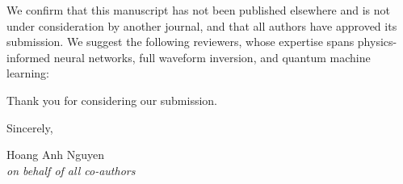 \documentclass[11pt]{article}
\begin{document}
We confirm that this manuscript has not been published elsewhere and is not under consideration by another journal, and that all authors have approved its submission. We suggest the following reviewers, whose expertise spans physics-informed neural networks, full waveform inversion, and quantum machine learning:

Thank you for considering our submission.

\vspace{0.8em}
\noindent Sincerely,

\vspace{2em}
\noindent Hoang Anh Nguyen \\
\emph{on behalf of all co-authors}
\end{document}
